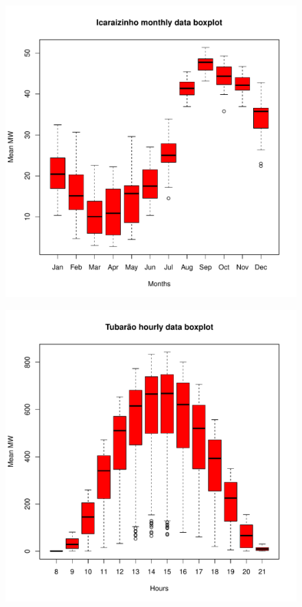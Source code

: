 \begin{figure}
	\centering
	\begin{minipage}[t]{\linewidth}
		
		\begin{minipage}[t]{0.45\linewidth}
			\includegraphics[width=\textwidth]{./../Figuras/Icaraizinho/icaraizinho-boxplot}
			\label{fig:icaraizinho-boxplot}
		\end{minipage}
		\begin{minipage}[t]{0.45\linewidth}
			\includegraphics[width=\textwidth]{./../Figuras/Solar-exemplos/tubarao-boxplot}

\end{minipage}
\end{minipage}
\end{figure}
